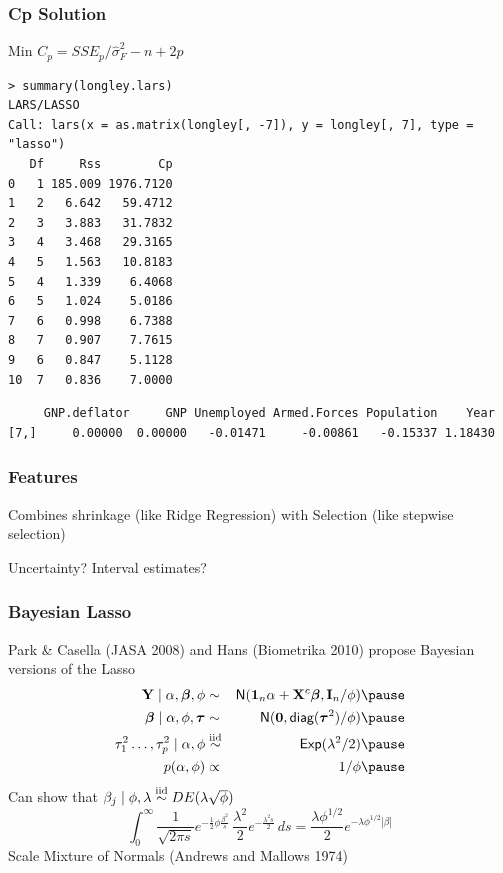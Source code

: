 \documentclass[handout]{beamer}
\begin{document}
\begin{frame}[fragile]
  \frametitle{Cp Solution}
Min $C_p = SSE_p/\hat{\sigma}^2_F - n + 2 p$  \pause
\begin{small}
\begin{verbatim}
> summary(longley.lars)
LARS/LASSO
Call: lars(x = as.matrix(longley[, -7]), y = longley[, 7], type = "lasso")
   Df     Rss        Cp
0   1 185.009 1976.7120
1   2   6.642   59.4712
2   3   3.883   31.7832
3   4   3.468   29.3165
4   5   1.563   10.8183
5   4   1.339    6.4068
6   5   1.024    5.0186
7   6   0.998    6.7388
8   7   0.907    7.7615
9   6   0.847    5.1128
10  7   0.836    7.0000
\end{verbatim}
\end{small}
 \pause
{\fontsize{9pt}{10pt} \selectfont 
\begin{verbatim}
     GNP.deflator     GNP Unemployed Armed.Forces Population    Year
[7,]     0.00000  0.00000   -0.01471     -0.00861   -0.15337 1.18430

\end{verbatim}
}

\end{frame}
\begin{frame}
  \frametitle{Features}
Combines shrinkage (like Ridge Regression) with Selection (like
stepwise selection) \pause

\vspace{2.5in}
Uncertainty?  Interval estimates?
\end{frame}
\begin{frame}
  \frametitle{Bayesian Lasso}
  Park \& Casella (JASA 2008) and Hans (Biometrika 2010) propose
  Bayesian versions of the Lasso  \pause
  \begin{eqnarray*}
    \Y \mid \alpha, \b, \phi & \sim & \N(\one_n \alpha + \X^c \b, \I_n/\phi)  \pause\\
    \b \mid \alpha, \phi, \taub & \sim & \N(\zero, \diag(\taub^2)/\phi)  \pause\\
    \tau_1^2 \ldots, \tau_p^2 \mid \alpha, \phi & \simiid & \Ex(\lambda^2/2)  \pause\\
    p(\alpha, \phi) & \propto& 1/\phi  \pause\\
  \end{eqnarray*}
Can show that $\beta_j \mid \phi, \lambda \mathrel{\mathop{\sim}\limits^{\rm iid}} DE(\lambda \sqrt{\phi})$
$$\int_0^\infty \frac{1}{\sqrt{2 \pi s}}
  e^{-\frac{1}{2} \phi \frac{\beta^2}{s }}
  \, \frac{\lambda^2}{2} e^{- \frac{\lambda^2 s}{2}}\, ds =
  \frac{\lambda \phi^{1/2}}{2} e^{-\lambda \phi^{1/2} |\beta|}
$$  \pause
Scale Mixture of Normals  (Andrews and Mallows 1974)
\end{frame}
\end{document}
